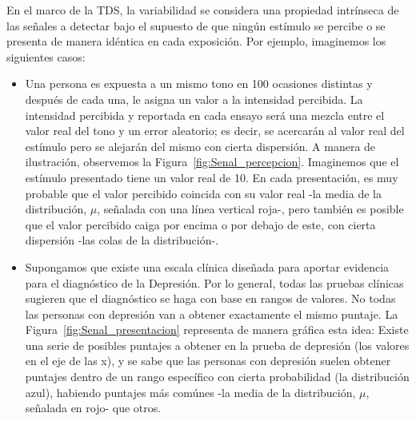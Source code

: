 \begin{itemize}
\begin{itemize}
En el marco de la TDS, la variabilidad se considera una propiedad intrínseca de las señales a detectar bajo el supuesto de que ningún estímulo se percibe o se presenta de manera idéntica en cada exposición. Por ejemplo, imaginemos los siguientes casos: \\

\begin{itemize}

\item Una persona es expuesta a un mismo tono en 100 ocasiones distintas y después de cada una, le asigna un valor a la intensidad percibida. La intensidad percibida y reportada en cada ensayo será una mezcla entre el valor real del tono y un error aleatorio; es decir, se acercarán al valor real del estímulo pero se alejarán del mismo con cierta dispersión. A manera de ilustración, observemos la Figura~\ref{fig:Senal_percepcion}. Imaginemos que el estímulo presentado tiene un valor real de 10. En cada presentación, es muy probable que el valor percibido coincida con su valor real -la media de la distribución, $\mu$, señalada con una línea vertical roja-, pero también es posible que el valor percibido caiga por encima o por debajo de este, con cierta dispersión -las colas de la distribución-. \\

\item Supongamos que existe una escala clínica diseñada para aportar evidencia para el diagnóstico de la Depresión. Por lo general, todas las pruebas clínicas sugieren que el diagnóstico se haga con base en rangos de valores. No todas las personas con depresión van a obtener exactamente el mismo puntaje. La Figura~\ref{fig:Senal_presentacion} representa de manera gráfica esta idea: Existe una serie de posibles puntajes a obtener en la prueba de depresión (los valores en el eje de las x), y se sabe que las personas con depresión suelen obtener puntajes dentro de un rango específico con cierta probabilidad (la distribución azul), habiendo puntajes más comúnes -la media de la distribución, $\mu$, señalada en rojo- que otros.\\

\end{itemize}


\end{itemize}
\end{itemize}
